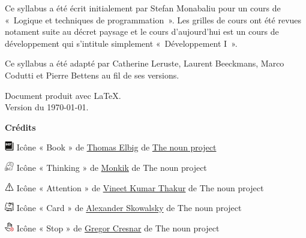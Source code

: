 
\thispagestyle{empty}

Ce syllabus a été écrit initialement par Stefan Monabaliu pour un cours de
«~Logique et techniques de programmation~». Les grilles de cours ont été revues
notament suite au décret paysage et le cours d'aujourd'hui est un cours de
développement qui s'intitule simplement «~Développement I~».

Ce syllabus a été adapté par Catherine Leruste, Laurent Beeckmans, Marco
Codutti et Pierre Bettens au fil de ses versions. 

\bigskip
\noindent
Document produit avec \LaTeX.
\\Version du \today.

\vfill

\textbf{Crédits}

\includegraphics[width=4mm]{icon/definition}
Icône « Book » de 
\href{https://thenounproject.com/dergraph}{Thomas Elbig} de 
\href{https://thenounproject.com}{The noun project}

\includegraphics[width=4mm]{icon/reflexion}
Icône « Thinking » de 
\href{https://thenounproject.com/kukkik_jung/}{Monkik} de 
The noun project

\includegraphics[width=4mm]{icon/attention}
Icône « Attention » de 
\href{https://thenounproject.com/vkvineet}{Vineet Kumar Thakur} de
The noun project

\includegraphics[width=4mm]{icon/fiche}
Icône « Card » de 
\href{https://thenounproject.com/sandorsz}{Alexander Skowalsky} de
The noun project

\includegraphics[width=4mm]{icon/dont}
Icône « Stop » de 
\href{https://thenounproject.com/grega.cresnar}{Gregor Cresnar} de
The noun project

